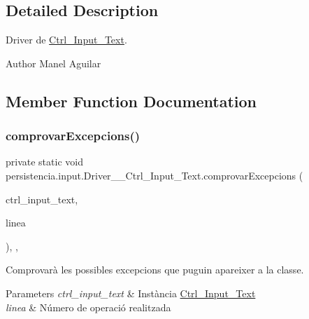 \subsection{Detailed Description}
Driver de \hyperlink{classpersistencia_1_1input_1_1Ctrl__Input__Text}{Ctrl\+\_\+\+Input\+\_\+\+Text}. 

\begin{DoxyAuthor}{Author}
Manel Aguilar 
\end{DoxyAuthor}


\subsection{Member Function Documentation}
\mbox{\label{classpersistencia_1_1input_1_1Driver____Ctrl__Input__Text_a3e4149adb11b97b330ce77f1c2b5ae9c}} 
\subsubsection{\texorpdfstring{comprovar\+Excepcions()}{comprovarExcepcions()}}
{\footnotesize\ttfamily private static void persistencia.\+input.\+Driver\+\_\+\+\_\+\+Ctrl\+\_\+\+Input\+\_\+\+Text.\+comprovar\+Excepcions (\begin{DoxyParamCaption}\item[{\hyperlink{classpersistencia_1_1input_1_1Ctrl__Input__Text}{Ctrl\+\_\+\+Input\+\_\+\+Text}}]{ctrl\+\_\+input\+\_\+text,  }\item[{String}]{linea }\end{DoxyParamCaption})\hspace{0.3cm}{\ttfamily [inline]}, {\ttfamily [static]}, {\ttfamily [private]}}



Comprovarà les possibles excepcions que puguin apareixer a la classe. 


\begin{DoxyParams}{Parameters}
{\em ctrl\+\_\+input\+\_\+text} & Instància \hyperlink{classpersistencia_1_1input_1_1Ctrl__Input__Text}{Ctrl\+\_\+\+Input\+\_\+\+Text} \\
\hline
{\em linea} & Número de operació realitzada \\
\hline
\end{DoxyParams}

